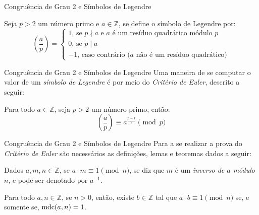 \begin{frame}[fragile]{Congruência de Grau 2 e Símbolos de Legendre}
    \begin{definicao}
        Seja $p > 2$ um número primo e $a \in \mathbb{Z}$, se define o símbolo de Legendre por:
        \begin{equation*}
            \left( \frac{a}{p} \right) = \begin{cases}
                1 \text{, se $p \nmid a$ e $a$ é um resíduo quadrático módulo $p$}
                \\
                0 \text{, se $p \mid a$}
                \\
                -1 \text{, caso contrário ($a$ não é um resíduo quadrático)}
                \end{cases}
        \end{equation*}
    \end{definicao}
\end{frame}

\begin{frame}[fragile]{Congruência de Grau 2 e Símbolos de Legendre}
    Uma maneira de se computar o valor de um \textit{símbolo de Legendre} é por meio do \textit{Critério de Euler}, descrito a seguir:
    \begin{teorema} Para todo $a \in \mathbb{Z}$, seja $p > 2$ um número primo, então: \label{teorema:criteriodeeuler}
        \begin{equation*}
            \left( \frac{a}{p} \right) \equiv a^{\frac{p-1}{2}} \pmod p
        \end{equation*}
    \end{teorema}
\end{frame}

\begin{frame}[fragile]{Congruência de Grau 2 e Símbolos de Legendre}
    Para a se realizar a prova do \textit{Critério de Euler} são necessários as definições, lemas e teoremas dados a seguir:

        \begin{definicao}
            Dados $a, m, n \in \mathbb{Z}$, se $a \cdot m \equiv 1 \pmod n$, se diz que $m$ é um \textit{inverso de $a$ módulo $n$}, e pode ser denotado por $a^{-1}$.
        \end{definicao}

        \begin{lema} \label{lema : mdcinv}
            Para todo $a, n \in \mathbb{Z}$, se $n > 0$, então, existe $b \in \mathbb{Z}$ tal que $a \cdot b \equiv 1 \pmod{n}$ se, e somente se, $\operatorname{mdc}(a, n) = 1$.
        \end{lema}
    
\end{frame}

